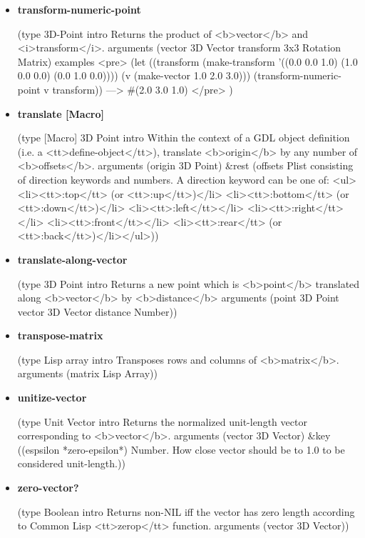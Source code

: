 \documentclass [11pt]{book}
\begin{document}
\begin{itemize}
\item {}
\label{prim:transform-numeric-point}
\textbf{transform-numeric-point}

(type 3D-Point intro
  Returns the product of <b>vector</b> and <i>transform</i>.
 arguments (vector 3D Vector transform 3x3 Rotation Matrix) examples 
<pre>
(let ((transform (make-transform '((0.0 0.0 1.0)
                                    (1.0 0.0 0.0)
                                    (0.0 1.0 0.0))))
       (v (make-vector 1.0 2.0 3.0)))
   (transform-numeric-point v transform))
  ---> \#(2.0 3.0 1.0)
</pre>
)



\item {}
\label{prim:translate}
\textbf{translate [Macro]}

(type [Macro] 3D Point intro
  Within the context of a GDL object definition (i.e. a <tt>define-object</tt>),
translate <b>origin</b> by any number of <b>offsets</b>.
 arguments (origin 3D Point) \&rest
 (offsets
  Plist consisting of direction keywords and numbers. A direction keyword can be 
one of: <ul><li><tt>:top</tt> (or <tt>:up</tt>)</li>
<li><tt>:bottom</tt> (or <tt>:down</tt>)</li>
<li><tt>:left</tt></li>
<li><tt>:right</tt></li>
<li><tt>:front</tt></li>
<li><tt>:rear</tt> (or <tt>:back</tt>)</li></ul>))



\item {}
\label{prim:translate-along-vector}
\textbf{translate-along-vector}

(type 3D Point intro
  Returns a new point which is <b>point</b> translated
along <b>vector</b> by <b>distance</b>
 arguments (point 3D Point vector 3D Vector distance Number))



\item {}
\label{prim:transpose-matrix}
\textbf{transpose-matrix}

(type Lisp array intro  Transposes rows and columns of <b>matrix</b>.
 arguments (matrix Lisp Array))



\item {}
\label{prim:unitize-vector}
\textbf{unitize-vector}

(type Unit Vector intro
  Returns the normalized unit-length vector corresponding to <b>vector</b>.
 arguments (vector 3D Vector) \&key
 ((espsilon *zero-epsilon*)
  Number. How close vector should be to 1.0 to be considered unit-length.))



\item {}
\label{prim:zero-vector?}
\textbf{zero-vector?}

(type Boolean intro
  Returns non-NIL iff the vector has zero length according to Common Lisp <tt>zerop</tt> function.
 arguments (vector 3D Vector))



\end{itemize}
\end{document}
